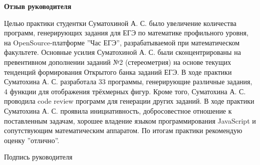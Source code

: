 \begin{center}
	\large\textbf{Отзыв руководителя}\\
\end{center}

Целью практики студентки Суматохиной А. С. было увеличение количества программ, генерирующих задания для ЕГЭ по математике профильного уровня, на OpenSource-платформе ”Час ЕГЭ”, разрабатываемой при математическом факультете. Основные усилия Суматохиной А. С. были сконцентрированы на превентивном дополнении заданий №2 (стереометрия) на основе текущих тенденций формирования Открытого банка заданий ЕГЭ. В ходе практики Суматохина А. С. разработала 33 программы, генерирующие различные задания, 4 функции для отображения трёхмерных фигур.
Кроме того, Суматохина А. С. проводила code review программ для генерации других заданий. В ходе практики Суматохина А. С. проявила инициативность, добросовестное отношение к поставленным задачам, хорошее владение языком программирования JavaScript и сопутствующим математическим аппаратом. По итогам практики рекомендую оценку ”отлично”.

\begin{flushright}
	Подпись руководителя \underline{\hspace{5cm}}
\end{flushright}
\newpage